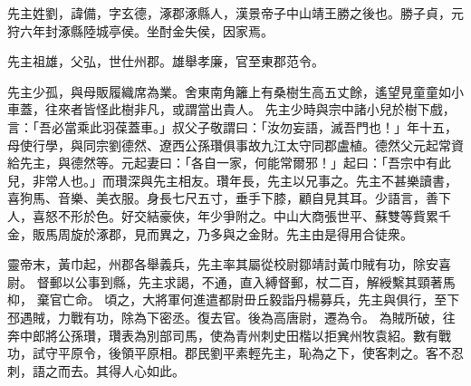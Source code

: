 \begin{pinyinscope}
 
 
 先主姓劉，諱備，字玄德，涿郡涿縣人，漢景帝子中山靖王勝之後也。勝子貞，元狩六年封涿縣陸城亭侯。坐酎金失侯，因家焉。
 
 
 先主祖雄，父弘，世仕州郡。雄舉孝廉，官至東郡范令。
 
 
先主少孤，與母販履織席為業。舍東南角籬上有桑樹生高五丈餘，遙望見童童如小車蓋，往來者皆怪此樹非凡，或謂當出貴人。
 先主少時與宗中諸小兒於樹下戲，言：「吾必當乘此羽葆蓋車。」叔父子敬謂曰：「汝勿妄語，滅吾門也！」年十五，母使行學，與同宗劉德然、遼西公孫瓚俱事故九江太守同郡盧植。德然父元起常資給先主，與德然等。元起妻曰：「各自一家，何能常爾邪！」起曰：「吾宗中有此兒，非常人也。」而瓚深與先主相友。瓚年長，先主以兄事之。先主不甚樂讀書，喜狗馬、音樂、美衣服。身長七尺五寸，垂手下膝，顧自見其耳。少語言，善下人，喜怒不形於色。好交結豪俠，年少爭附之。中山大商張世平、蘇雙等貲累千金，販馬周旋於涿郡，見而異之，乃多與之金財。先主由是得用合徒衆。
 
 
靈帝末，黃巾起，州郡各舉義兵，先主率其屬從校尉鄒靖討黃巾賊有功，除安喜尉。
 督郵以公事到縣，先主求謁，不通，直入縛督郵，杖二百，解綬繫其頸著馬枊，
 棄官亡命。
 頃之，大將軍何進遣都尉毌丘毅詣丹楊募兵，先主與俱行，至下邳遇賊，力戰有功，除為下密丞。復去官。後為高唐尉，遷為令。
 為賊所破，往奔中郎將公孫瓚，瓚表為別部司馬，使為青州刺史田楷以拒兾州牧袁紹。數有戰功，試守平原令，後領平原相。郡民劉平素輕先主，恥為之下，使客刺之。客不忍刺，語之而去。其得人心如此。
 

\end{pinyinscope}
